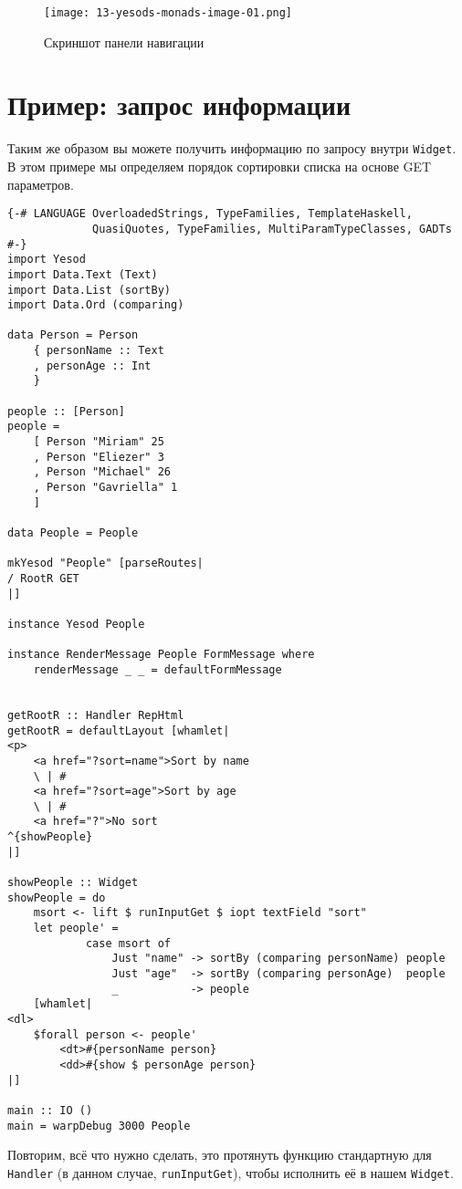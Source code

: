 \begin{figure}[tbh]
  \centering
  \caption{Скриншот панели навигации}
  \texttt{[image: 13-yesods-monads-image-01.png]}
\end{figure}

\section{Пример: запрос информации}

Таким же образом вы можете получить информацию по запросу внутри \lstinline'Widget'. В
этом примере мы определяем порядок сортировки списка на основе GET параметров.

\begin{lstlisting}
{-# LANGUAGE OverloadedStrings, TypeFamilies, TemplateHaskell,
             QuasiQuotes, TypeFamilies, MultiParamTypeClasses, GADTs #-}
import Yesod
import Data.Text (Text)
import Data.List (sortBy)
import Data.Ord (comparing)

data Person = Person
    { personName :: Text
    , personAge :: Int
    }

people :: [Person]
people =
    [ Person "Miriam" 25
    , Person "Eliezer" 3
    , Person "Michael" 26
    , Person "Gavriella" 1
    ]

data People = People

mkYesod "People" [parseRoutes|
/ RootR GET
|]

instance Yesod People

instance RenderMessage People FormMessage where
    renderMessage _ _ = defaultFormMessage


getRootR :: Handler RepHtml
getRootR = defaultLayout [whamlet|
<p>
    <a href="?sort=name">Sort by name
    \ | #
    <a href="?sort=age">Sort by age
    \ | #
    <a href="?">No sort
^{showPeople}
|]

showPeople :: Widget
showPeople = do
    msort <- lift $ runInputGet $ iopt textField "sort"
    let people' =
            case msort of
                Just "name" -> sortBy (comparing personName) people
                Just "age"  -> sortBy (comparing personAge)  people
                _           -> people
    [whamlet|
<dl>
    $forall person <- people'
        <dt>#{personName person}
        <dd>#{show $ personAge person}
|]

main :: IO ()
main = warpDebug 3000 People
\end{lstlisting}

Повторим, всё что нужно сделать, это протянуть функцию стандартную для \lstinline'Handler'
(в данном случае, \lstinline'runInputGet'), чтобы исполнить её в нашем \lstinline'Widget'.

